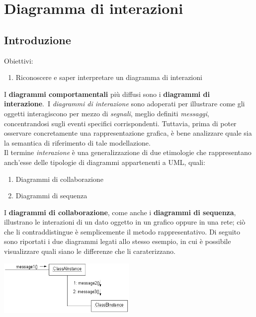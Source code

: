 \documentclass{article}
\begin{document}
\pagestyle{empty}

\section*{Diagramma di interazioni}
\large
\subsection*{Introduzione}
Obiettivi:
\begin{enumerate}
    \renewcommand{\labelenumi}{-}
    \item Riconoscere e saper interpretare un diagramma di interazioni
\end{enumerate}
I \textbf{diagrammi comportamentali} più diffusi sono i \textbf{diagrammi di interazione}.\ I \textit{diagrammi di interazione} sono adoperati per illustrare come gli oggetti interagiscono per mezzo di \textit{segnali}, meglio definiti \textit{messaggi}, concentrandosi sugli eventi specifici corrispondenti. Tuttavia, prima di poter osservare concretamente una rappresentazione grafica, è bene analizzare quale sia la semantica di riferimento di tale modellazione.\vspace*{14pt}\\
Il termine \textit{interazione} è una generalizzazione di due etimologie che rappresentano anch'esse delle tipologie di diagrammi appartenenti a UML, quali:
\begin{enumerate}
    \renewcommand{\labelenumi}{-}
    \item Diagrammi di collaborazione
    \item Diagrammi di sequenza
\end{enumerate}
I \textbf{diagrammi di collaborazione}, come anche i \textbf{diagrammi di sequenza}, illustrano le interazioni di un dato oggetto in un grafico oppure in una rete; ciò che li contraddistingue è semplicemente il metodo rappresentativo. Di seguito sono riportati i due diagrammi legati allo stesso esempio, in cui è possibile visualizzare quali siano le differenze che li caraterizzano.\vspace*{14pt}
\begin{center}
    \includegraphics[width=0.5\textwidth]{foto 1.png}
\end{center}
\end{document}
